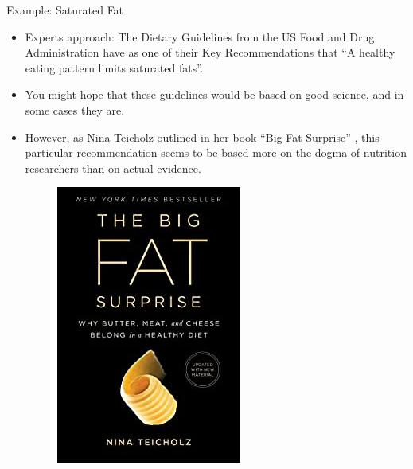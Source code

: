 \documentclass[handout]{beamer}
\begin{document}
\begin{frame}{Example: Saturated Fat}

\scriptsize{
\begin{itemize}
\item Experts approach:  The Dietary Guidelines from the US Food and Drug Administration have as one of their Key Recommendations that ``A healthy eating pattern limits saturated fats''. 

\item You might hope that these guidelines would be based on good science, and in some cases they are.

\item However, as Nina Teicholz outlined in her book ``Big Fat Surprise'' \cite{teicholz2014big}, this particular recommendation seems to be based more on the dogma of nutrition researchers than on actual evidence. 

\begin{figure}[h!]
	\centering
	\includegraphics[scale=0.35]{pics/bigfat.jpg}
\end{figure}


\end{itemize}

}
 
\end{frame}
\end{document}
